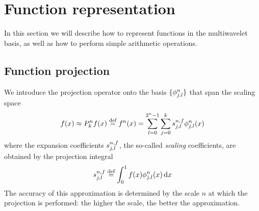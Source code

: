 \section{Function representation}
In this section we will describe how to represent functions in the multiwavelet
basis, as well as how to perform simple arithmetic operations.

\subsection{Function projection}
We introduce the projection operator  onto the basis 
$\lbrace\phi^n_{j,l}\rbrace$ that span the scaling space 
\begin{equation}
    \label{eq:scaling_exp}
    f(x) \approx {P}_{k}^{n}f(x) \stackrel{\text{def}}{\hbox{=}} {f}^{n}(x) =
	\sum_{l=0}^{2^n-1}\sum_{j=0}^ks^{n,f}_{j,l}\phi^n_{j,l}(x)
\end{equation}
where the expansion coefficients $s^{n,f}_{j,l}$, the so-called 
\emph{scaling} coefficients, are obtained by the projection integral
\begin{equation}
    \label{eq:scaling_coef}
    s^{n,f}_{j,l} \stackrel{\text{def}}{\hbox{=}} \int_0^1f(x)\phi^n_{j,l}(x)\,\mathrm{d} x
\end{equation}
The accuracy of this approximation is determined by the scale $n$ at which the
projection is performed: the higher the scale, the better the approximation.

